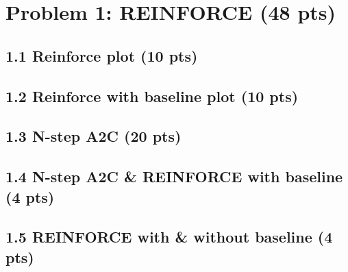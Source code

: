 \documentclass[12pt]{article}
\begin{document}
\newpage
\section*{Problem 1: REINFORCE (48 pts)}

\subsection*{1.1 Reinforce plot (10 pts)}
\begin{solution}[height=9cm]
\end{solution}

\subsection*{1.2 Reinforce with baseline plot (10 pts)}
\begin{solution}[height=9cm]
\end{solution}

\subsection*{1.3 N-step A2C (20 pts)}
\begin{solution}[height=20cm]
\end{solution}

\subsection*{1.4 N-step A2C \& REINFORCE with baseline (4 pts)}
\begin{solution}[height=5cm]
\end{solution}

\subsection*{1.5 REINFORCE with \& without baseline (4 pts)}
\begin{solution}[height=5cm]
\end{solution}
\end{document}
